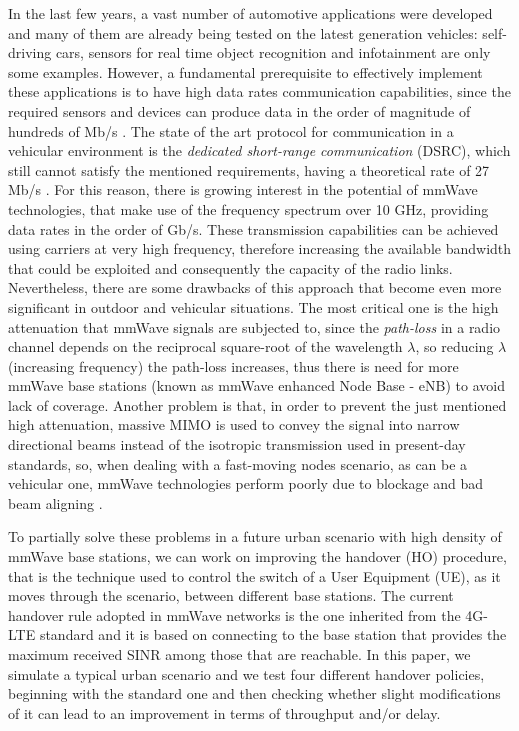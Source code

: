 \documentclass[conference,10pt]{IEEEtran}
\begin{document}
In the last few years, a vast number of automotive applications were developed and many of them are already being tested on the latest generation vehicles: self-driving cars, sensors for real time object recognition and infotainment are only some examples. However, a fundamental prerequisite to effectively implement these applications is to have high data rates communication capabilities, since the required sensors and devices can produce data in the order of magnitude of hundreds of Mb/s \cite{surveh}.
The state of the art protocol for communication in a vehicular environment is the \emph{dedicated short-range communication} (DSRC), which still cannot satisfy the mentioned requirements, having a theoretical rate of 27 Mb/s \cite{surveh}. For this reason, there is growing interest in the potential of mmWave technologies, that make use of the frequency spectrum over 10 GHz, providing data rates in the order of Gb/s. These transmission capabilities can be achieved using carriers at very high frequency, therefore increasing the available bandwidth that could be exploited and consequently the capacity of the radio links. Nevertheless, there are some drawbacks of this approach that become even more significant in outdoor and vehicular situations. The most critical one is the high attenuation that mmWave signals are subjected to, since the \emph{path-loss} in a radio channel depends on the reciprocal square-root of the wavelength $\lambda$, so reducing $\lambda$ (increasing frequency) the path-loss increases, thus there is need for more mmWave base stations (known as mmWave enhanced Node Base - eNB) to avoid lack of coverage. Another problem is that, in order to prevent the just mentioned high attenuation, massive MIMO is used to convey the signal into narrow directional beams instead of the isotropic transmission used in present-day standards, so, when dealing with a fast-moving nodes scenario, as can be a vehicular one, mmWave technologies perform poorly due to blockage and bad beam aligning \cite{mmvehicle}.

To partially solve these problems in a future urban scenario with high density of mmWave base stations, we can work on improving the handover (HO) procedure, that is the technique used to control the switch of a User Equipment (UE), as it moves through the scenario, between different base stations. The current handover rule adopted in mmWave networks is the one inherited from the 4G-LTE standard and it is based on connecting to the base station that provides the maximum received SINR among those that are reachable. In this paper, we simulate a typical urban scenario and we test four different handover policies, beginning with the standard one and then checking whether slight modifications of it can lead to an improvement in terms of throughput and/or delay.
\end{document}
